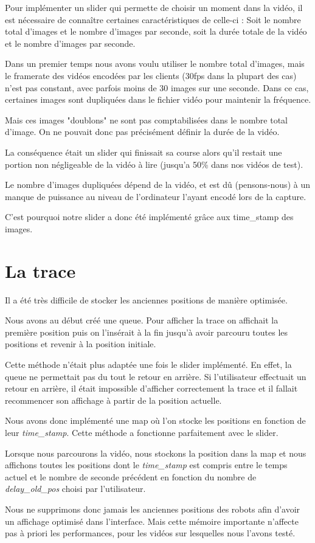 Pour implémenter un slider qui permette de choisir un moment dans
la vidéo, il est nécessaire de connaître certaines
caractéristiques de celle-ci : Soit le nombre total d'images et
le nombre d'images par seconde, soit la durée totale de la vidéo
et le nombre d'images par seconde. 
\bigskip

Dans un premier temps nous avons voulu utiliser le nombre total
d'images, mais le framerate des vidéos encodées par les clients
(30fps dans la plupart des cas) n'est pas constant, avec parfois
moins de 30 images sur une seconde. Dans ce cas, certaines images
sont dupliquées dans le fichier vidéo pour maintenir la
fréquence. 
\bigskip 

Mais ces images "doublons" ne sont pas comptabilisées dans le
nombre total d'image. On ne pouvait donc pas précisément définir
la durée de la vidéo.

La conséquence était un slider qui finissait sa course alors
qu'il restait une portion non négligeable de la vidéo à lire
(jusqu'a 50\% dans nos vidéos de test).
\bigskip

Le nombre d'images dupliquées dépend de la vidéo, et est dû
(pensons-nous) à un manque de puissance au niveau de l'ordinateur
l'ayant encodé lors de la capture. 

C'est pourquoi notre slider a donc été implémenté grâce aux
time\_stamp des images.

\section{La trace}

Il a été très difficile de stocker les anciennes positions de
manière optimisée.

Nous avons au début créé une queue. Pour afficher la trace on
affichait la première position puis on l'insérait à la fin
jusqu'à avoir parcouru toutes les positions et revenir à la
position initiale. 
\bigskip

Cette méthode n'était plus adaptée une fois le slider implémenté.
En effet, la queue ne permettait pas du tout le retour en
arrière. Si l'utilisateur effectuait un retour en arrière, il
était impossible d'afficher correctement la trace et il fallait
recommencer son affichage à partir de la position actuelle. 
\bigskip

Nous avons donc implémenté une map où l'on stocke les positions
en fonction de leur \textit{time\_stamp}. Cette méthode a
fonctionne parfaitement avec le slider. 

Lorsque nous parcourons la vidéo, nous stockons la position dans
la map et nous affichons toutes les positions dont le
\textit{time\_stamp} est compris entre le temps actuel et le
nombre de seconde précédent en fonction du nombre de
\textit{delay\_old\_pos} choisi par l'utilisateur.
\bigskip

Nous ne supprimons donc jamais les anciennes positions des robots
afin d'avoir un affichage optimisé dans l'interface. Mais cette
mémoire importante n'affecte pas à priori les performances, pour
les vidéos sur lesquelles nous l'avons testé.

